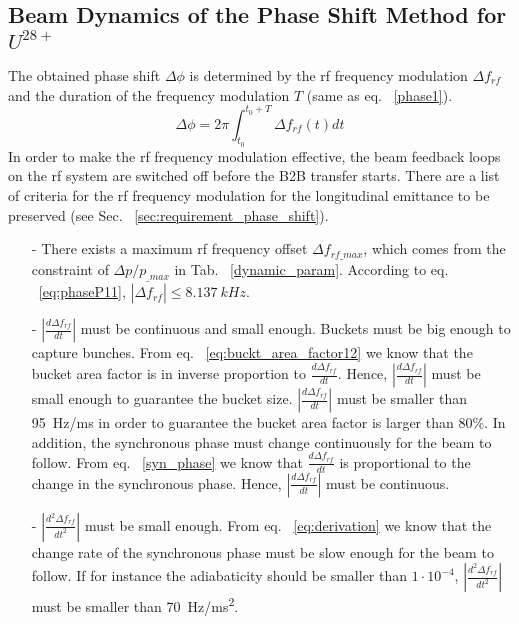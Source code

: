\subsection{Beam Dynamics of the Phase Shift Method for $U^\mathit{28+}$}
The obtained phase shift $\Delta \phi$ is determined by the rf frequency modulation $\Delta f_{rf}$ and the duration of the frequency modulation $T$ (same as eq. ~\ref{phase1}). 
\begin{equation}
\Delta \phi= 2\pi \int_{t_0}^{t_0+T} \Delta f_{rf}(t)dt \label{phase_integration}
\end{equation}
In order to make the rf frequency modulation effective, the beam feedback loops on the rf system are switched off before the B2B transfer starts. There are a list of criteria for the rf frequency modulation for the longitudinal emittance to be preserved (see Sec. ~\ref{sec:requirement_phase_shift}).
\begin{itemize}
\item[-]
There exists a maximum rf frequency offset $\Delta f_\mathit{rf\_max}$, which comes from the constraint of $\Delta p/p_\mathit{\_max}$ in Tab. ~\ref{dynamic_param}. According to eq. ~\ref{eq:phaseP11}, $|\Delta f_\mathit{rf}| \le \SI{8.137}{kHz}$.
\item[-]
$|\frac{d\Delta f_{\mathit{rf}}}{dt}|$ must be continuous and small enough. Buckets must be big enough to capture bunches. From eq. ~\ref{eq:buckt_area_factor12} we know that the bucket area factor is in inverse proportion to $\frac{d\Delta f_{\mathit{rf}}}{dt}$. Hence, $|\frac{d\Delta f_{\mathit{rf}}}{dt}|$ must be small enough to guarantee the bucket size. $|\frac{d\Delta f_{\mathit{rf}}}{dt}|$ must be smaller than \SI{95}{Hz/ms} in order to guarantee the bucket area factor is larger than $80\%$. In addition, the synchronous phase must change continuously for the beam to follow. From eq. ~\ref{syn_phase} we know that $\frac{d\Delta f_{\mathit{rf}}}{dt}$ is proportional to the change in the synchronous phase. Hence, $|\frac{d\Delta f_{\mathit{rf}}}{dt}|$ must be continuous.
\item[-]
$|\frac{d^2\Delta f_{\mathit{rf}}}{dt^2}|$ must be small enough. From eq. ~\ref{eq:derivation} we know that the change rate of the synchronous phase must be slow enough for the beam to follow. If for instance the adiabaticity should be smaller than $1\cdot10^{-4}$, $|\frac{d^2\Delta f_{\mathit{rf}}}{dt^2}|$ must be smaller than \SI{70}{Hz/ms^2}.
\end{itemize}

